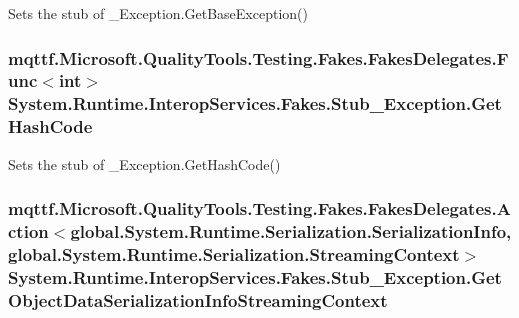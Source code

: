 Sets the stub of \-\_\-\-Exception.\-Get\-Base\-Exception()

\hypertarget{class_system_1_1_runtime_1_1_interop_services_1_1_fakes_1_1_stub___exception_aa95aa7ce54605094054df2c97a8b8fd4}{
\subsubsection[{Get\-Hash\-Code}]{\setlength{\rightskip}{0pt plus 5cm}mqttf.\-Microsoft.\-Quality\-Tools.\-Testing.\-Fakes.\-Fakes\-Delegates.\-Func$<$int$>$ System.\-Runtime.\-Interop\-Services.\-Fakes.\-Stub\-\_\-\-Exception.\-Get\-Hash\-Code}}\label{class_system_1_1_runtime_1_1_interop_services_1_1_fakes_1_1_stub___exception_aa95aa7ce54605094054df2c97a8b8fd4}


Sets the stub of \-\_\-\-Exception.\-Get\-Hash\-Code()

\hypertarget{class_system_1_1_runtime_1_1_interop_services_1_1_fakes_1_1_stub___exception_a967efc45c4f5789d231d92027a9191c3}{
\subsubsection[{Get\-Object\-Data\-Serialization\-Info\-Streaming\-Context}]{\setlength{\rightskip}{0pt plus 5cm}mqttf.\-Microsoft.\-Quality\-Tools.\-Testing.\-Fakes.\-Fakes\-Delegates.\-Action$<$global.\-System.\-Runtime.\-Serialization.\-Serialization\-Info, global.\-System.\-Runtime.\-Serialization.\-Streaming\-Context$>$ System.\-Runtime.\-Interop\-Services.\-Fakes.\-Stub\-\_\-\-Exception.\-Get\-Object\-Data\-Serialization\-Info\-Streaming\-Context}}\label{class_system_1_1_runtime_1_1_interop_services_1_1_fakes_1_1_stub___exception_a967efc45c4f5789d231d92027a9191c3}


